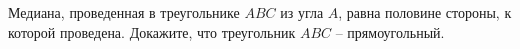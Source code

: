 \begin{ex}
	\begin{condition}
		Медиана, проведенная в треугольнике \( ABC \) из угла \( A \), равна половине стороны, к которой проведена. Докажите, что треугольник \( ABC \) -- прямоугольный.
	\end{condition}
\end{ex}